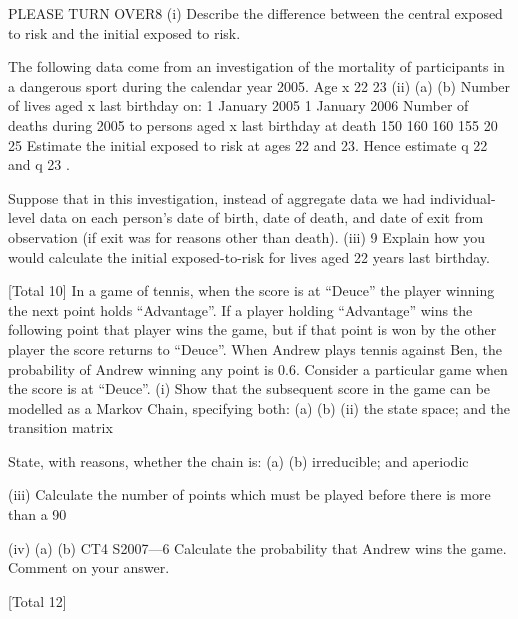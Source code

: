 \documentclass[a4paper,12pt]{article}
\begin{document}
\begin{enumerate}
PLEASE TURN OVER8
(i)
Describe the difference between the central exposed to risk and the initial
exposed to risk.

The following data come from an investigation of the mortality of participants in a
dangerous sport during the calendar year 2005.
Age x
22
23
(ii)
(a)
(b)
Number of lives aged x last
birthday on:
1 January 2005 1 January 2006 Number of deaths
during 2005 to
persons aged x last
birthday at death
150
160 160
155 20
25
Estimate the initial exposed to risk at ages 22 and 23.
Hence estimate q 22 and q 23 .

Suppose that in this investigation, instead of aggregate data we had individual-level
data on each person’s date of birth, date of death, and date of exit from observation (if
exit was for reasons other than death).
(iii)
9
Explain how you would calculate the initial exposed-to-risk for lives aged 22
years last birthday.

[Total 10]
In a game of tennis, when the score is at “Deuce” the player winning the next point
holds “Advantage”. If a player holding “Advantage” wins the following point that
player wins the game, but if that point is won by the other player the score returns to
“Deuce”.
When Andrew plays tennis against Ben, the probability of Andrew winning any point
is 0.6. Consider a particular game when the score is at “Deuce”.
(i)
Show that the subsequent score in the game can be modelled as a Markov
Chain, specifying both:
(a)
(b)
(ii)
the state space; and
the transition matrix

State, with reasons, whether the chain is:
(a)
(b)
irreducible; and
aperiodic

(iii) Calculate the number of points which must be played before there is more than
a 90%

(iv) (a)
(b)
CT4 S2007—6
Calculate the probability that Andrew wins the game.
Comment on your answer.

[Total 12]


\end{enumerate}
\end{document}
